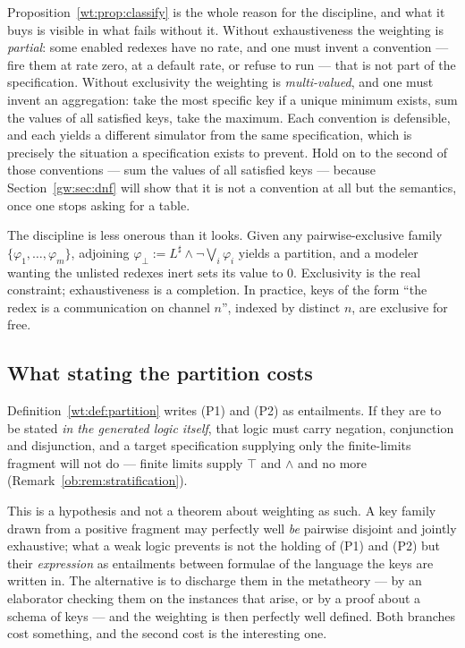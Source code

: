 Proposition~\ref{wt:prop:classify} is the whole reason for the discipline, and what it
buys is visible in what fails without it. Without exhaustiveness the weighting is
\emph{partial}: some enabled redexes have no rate, and one must invent a convention ---
fire them at rate zero, at a default rate, or refuse to run --- that is not part of the
specification. Without exclusivity the weighting is \emph{multi-valued}, and one must
invent an aggregation: take the most specific key if a unique minimum exists, sum the
values of all satisfied keys, take the maximum. Each convention is defensible, and each
yields a different simulator from the same specification, which is precisely the situation
a specification exists to prevent. Hold on to the second of those conventions --- sum the
values of all satisfied keys --- because Section~\ref{gw:sec:dnf} will show that it is not
a convention at all but the semantics, once one stops asking for a table.

\begin{remark}
\label{wt:rmk:default}
The discipline is less onerous than it looks. Given any pairwise-exclusive family
$\{\varphi_1,\ldots,\varphi_m\}$, adjoining
$\varphi_{\bot} := L^{\sharp} \wedge \neg\bigvee_i \varphi_i$ yields a partition, and a
modeler wanting the unlisted redexes inert sets its value to $0$. Exclusivity is the
real constraint; exhaustiveness is a completion. In practice, keys of the form ``the
redex is a communication on channel $n$'', indexed by distinct $n$, are exclusive for
free.
\end{remark}

\subsection{What stating the partition costs}
\label{wt:sec:closure}

Definition~\ref{wt:def:partition} writes (P1) and (P2) as entailments. If they are to be
stated \emph{in the generated logic itself}, that logic must carry negation, conjunction
and disjunction, and a target specification supplying only the finite-limits fragment
will not do --- finite limits supply $\top$ and $\wedge$ and no more
(Remark~\ref{ob:rem:stratification}).

This is a hypothesis and not a theorem about weighting as such. A key family drawn from a
positive fragment may perfectly well \emph{be} pairwise disjoint and jointly exhaustive;
what a weak logic prevents is not the holding of (P1) and (P2) but their \emph{expression}
as entailments between formulae of the language the keys are written in. The alternative
is to discharge them in the metatheory --- by an elaborator checking them on the instances
that arise, or by a proof about a schema of keys --- and the weighting is then perfectly
well defined. Both branches cost something, and the second cost is the interesting one.

